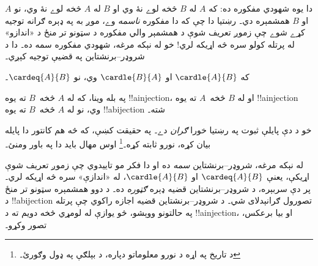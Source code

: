 \documentclass[../../../include/open-logic-section]{subfiles}
\begin{document}


\begin{explain}
دا يوه شهودي مفکوره ده: که $A$ له $B$ څخه لوے نۀ وي او $B$ له
$A$ څخه لوے نۀ وي، نو $A$ او $B$ همشمېره دي۔ رښتيا دا چې که
دا مفکوره \emph{ناسمه} وے، موږ به په ډېره ګرانه توجيه کړے شوے
چې زموږ تعريف شوې د همشمېر والي مفکوره د سټونو تر منځ د «اندازو»
له پرتله کولو سره څه اړيکه لري!{} خو له نېکه مرغه، شهودي مفکوره
سمه ده۔ دا د شروډر–برنشتاين په قضيې توجيه کېږي۔
\end{explain}

\begin{thm}
	که $\cardle{A}{B}$ او $\cardle{B}{A}$ وي،
	نو $\cardeq{A}{B}$۔
\end{thm}

\begin{explain}
په بله وينا، که له $A$ څخه~$B$ ته يوه !!a{injection}، او له
$B$ څخه~$A$ ته يوه !!a{injection} وي، نو له $A$ څخه~$B$ ته
يوه !!a{bijection} شته۔

خو د دې پايلې ثبوت په رښتيا خورا \emph{ګران} دے۔ په حقيقت کښې،
که څه هم کانتور دا پايله بيان کړه، نورو ثابته کړه۔\footnote{د
تاريخ په اړه د نورو معلوماتو دپاره، د بېلګې په ډول
\citet[pp.~165--6]{Potter2004} وګورئ۔}
%
اوس مهال بايد دا په باور ومنئ۔

له نېکه مرغه، شروډر–برنشتاين \emph{سمه} ده او دا فکر مو تاييدوي
چې زموږ تعريف شوې اړيکې، يعنې $\cardeq{A}{B}$ او
$\cardle{A}{B}$، له «اندازې» سره څه اړيکه لري۔ پر دې سربېره، د
شروډر–برنشتاين قضيه ډېره \emph{ګټوره} ده۔ د دوو همشمېره سټونو
تر منځ د !!a{bijection} تصورول ګرانېدلای شي۔ د شروډر–برنشتاين
قضيه اجازه راکوي چې پرتله په حالتونو ووېشو، څو يوازې له لومړي
څخه دويم ته د !!a{injection}، او بيا برعکس، تصور وکړو۔
\end{explain}
\end{document}
